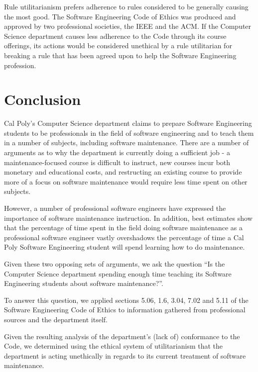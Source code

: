 \documentclass[11pt]{article}
\begin{document}
\begin{multicols}{2}
Rule utilitarianism prefers adherence to rules considered to be generally causing the most good. \cite{ruleUtilitarianism}  The Software Engineering Code of Ethics was produced and approved by two professional societies, the IEEE and the ACM. \cite{secode}  If the Computer Science department causes less adherence to the Code through its course offerings, its actions would be considered unethical by a rule utilitarian for breaking a rule that has been agreed upon to help the Software Engineering profession.


\section{Conclusion}

Cal Poly's Computer Science department claims to prepare Software Engineering students to be professionals in the field of software engineering and to teach them in a number of subjects, including software maintenance. \cite{catalogDept}  There are a number of arguments as to why the department is currently doing a sufficient job - a maintenance-focused course is difficult to instruct, new courses incur both monetary and educational costs, and restructing an existing course to provide more of a focus on software maintenance would require less time spent on other subjects.

However, a number of professional software engineers have expressed the importance of software maintenance instruction.  In addition, best estimates show that the percentage of time spent in the field doing software maintenance as a professional software engineer vastly overshadows the percentage of time a Cal Poly Software Engineering student will spend learning how to do maintenance.

Given these two opposing sets of arguments, we ask the question ``Is the Computer Science department spending enough time teaching its Software Engineering students about software maintenance?''.

To answer this question, we applied sections 5.06, 1.6, 3.04, 7.02 and 5.11 of the Software Engineering Code of Ethics to information gathered from professional sources and the department itself.

Given the resulting analysis of the department's (lack of) conformance to the Code, we determined using the ethical system of utilitarianism that the department is acting unethically in regards to its current treatment of software maintenance.

\end{multicols}
\newpage

\nocite{*}




\end{document}
